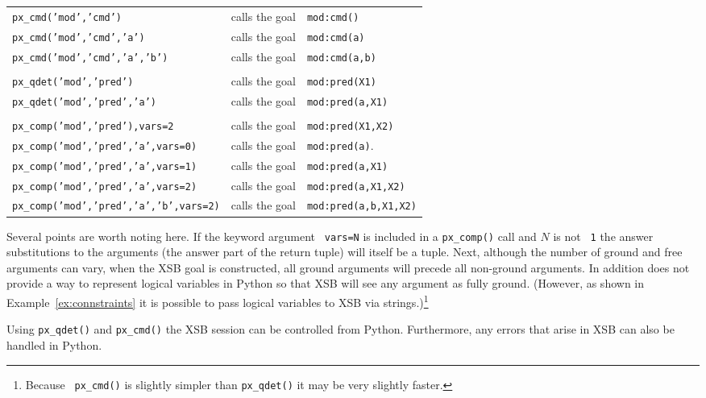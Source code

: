\begin{example}
\begin{tabular}{lll}
  {\tt px\_cmd('mod','cmd')}                & calls the goal & {\tt mod:cmd()}\\
  {\tt px\_cmd('mod','cmd','a')}            & calls the goal & {\tt mod:cmd(a)}\\
  {\tt px\_cmd('mod','cmd','a','b')}        & calls the goal & {\tt mod:cmd(a,b)}\\
   \\ 
  {\tt px\_qdet('mod','pred')}              & calls the goal & {\tt mod:pred(X1)} \\
  {\tt px\_qdet('mod','pred','a')}          & calls the goal & {\tt mod:pred(a,X1)} \\
  \\
  {\tt px\_comp('mod','pred'),vars=2}       & calls the goal & {\tt mod:pred(X1,X2)} \\
  {\tt px\_comp('mod','pred','a',vars=0)}   & calls the goal & {\tt mod:pred(a)}. \\
  {\tt px\_comp('mod','pred','a',vars=1)}   & calls the goal & {\tt mod:pred(a,X1)} \\
  {\tt px\_comp('mod','pred','a',vars=2)}   & calls the goal & {\tt mod:pred(a,X1,X2)} \\
  {\tt px\_comp('mod','pred','a','b',vars=2)} & calls the goal & {\tt mod:pred(a,b,X1,X2)} \\
\end{tabular}

Several points are worth noting here.  If the keyword argument {\tt
  vars=N} is included in a {\tt px\_comp()} call and $N$ is not {\tt
  1} the answer substitutions to the arguments (the answer part of the
return tuple) will itself be a tuple.  Next, although the number of
ground and free arguments can vary, when the XSB goal is constructed,
all ground arguments will precede all non-ground arguments.  In
addition \px{} does not provide a way to represent logical variables
in Python so that XSB will see any argument as fully ground.
(However, as shown in Example~\ref{ex:connstraints} it is possible to
pass logical variables to XSB via strings.)\footnote{Because {\tt
    px\_cmd()} is slightly simpler than {\tt px\_qdet()} it may be
  very slightly faster.}
\end{example}

Using {\tt px\_qdet()} and {\tt px\_cmd()} the XSB session can be
controlled from Python.  Furthermore, any errors that arise in XSB can
also be handled in Python.

